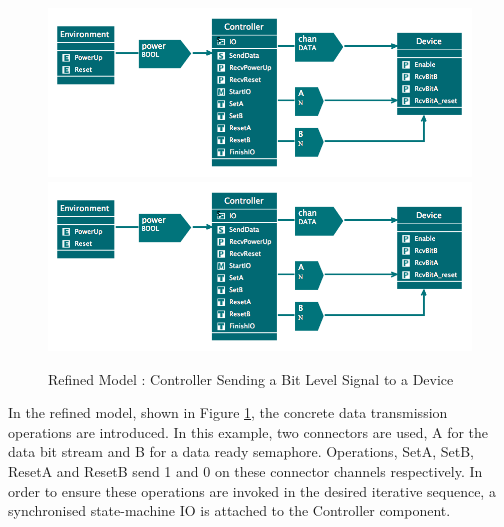  \begin{figure}[!htbp]
  \centering
  \ifplastex
  \includegraphics[width=1024]{figures/image54.png}
  \else
  \includegraphics[width=1\textwidth]{figures/image54.png}
  \fi
  \caption{Refined Model : Controller Sending a Bit Level Signal to a Device}
  \label{fig:RefinedModelControllerSendingABitLevelSignalToADevice}
\end{figure} 

In the refined model, shown in Figure \ref{fig:RefinedModelControllerSendingABitLevelSignalToADevice}, the concrete data transmission operations are introduced. In this example, two connectors are used, A for the data bit stream and B for a data ready semaphore. Operations, SetA, SetB, ResetA and ResetB send 1 and 0 on these connector channels respectively. In order to ensure these operations are invoked in the desired iterative sequence, a synchronised state-machine IO is attached to the Controller component. 

